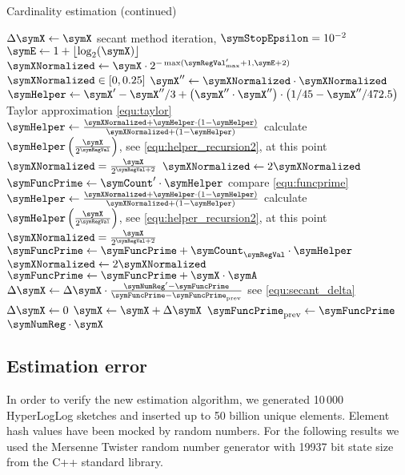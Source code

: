 \documentclass[a4paper]{scrartcl}
\begin{document}
\begin{algorithm}
\caption{Cardinality estimation (continued)}
\begin{algorithmic}
\State $\Delta\symX \gets \symX$
\While{$\Delta\symX > \symX\cdot\symError$} \Comment secant method iteration, $\symStopEpsilon = 10^{-2}$
\State $\symE \gets 1+\lfloor\log_2(\symX)\rfloor$
\State $\symXNormalized \gets
\symX \cdot 2^{-\max(\symRegVal'_\text{max}+1, \symE+2)}$
\Comment $\symXNormalized \in [0, 0.25]$
\State $\symX''\gets \symXNormalized\cdot\symXNormalized$
\State $\symHelper \gets
\symX' - \symX''/3 + \left(\symX''\cdot \symX''\right)\cdot\left(1/45-\symX''/472.5\right)$
\Comment Taylor approximation \eqref{equ:taylor}
\State $\symHelper \gets \frac{\symXNormalized+\symHelper\cdot(1-\symHelper)}{\symXNormalized+(1-\symHelper)}$
\Comment calculate $\symHelper\left(\frac{\symX}{2^{\symRegVal}}\right)$, see \eqref{equ:helper_recursion2}, at this point $\symXNormalized = \frac{\symX}{2^{\symRegVal+2}}$
\State $\symXNormalized \gets 2\symXNormalized$
\EndFor
\State $\symFuncPrime \gets \symCount'\cdot\symHelper$
\Comment compare \eqref{equ:funcprime}
\State $\symHelper \gets \frac{\symXNormalized+\symHelper\cdot(1-\symHelper)}{\symXNormalized+(1-\symHelper)}$
\Comment calculate $\symHelper\left(\frac{\symX}{2^{\symRegVal}}\right)$, see \eqref{equ:helper_recursion2}, at this point $\symXNormalized = \frac{\symX}{2^{\symRegVal+2}}$
\State $\symFuncPrime\gets \symFuncPrime + \symCount_\symRegVal\cdot\symHelper$
\State $\symXNormalized \gets 2\symXNormalized$
\EndFor
\State $\symFuncPrime\gets \symFuncPrime + \symX\cdot\symA$
\State $\Delta\symX \gets \Delta\symX \cdot \frac{\symNumReg' - \symFuncPrime}{\symFuncPrime - \symFuncPrime_\text{prev}}$
\Comment see \eqref{equ:secant_delta}
\Else
\State $\Delta\symX \gets 0$
\EndIf
\State $\symX \gets \symX + \Delta\symX$
\State $\symFuncPrime_\text{prev}\gets \symFuncPrime$
\EndWhile
\State \Return $\symNumReg\cdot\symX$
\EndFunction
\end{algorithmic}
\end{algorithm}

\subsection{Estimation error}
In order to verify the new estimation algorithm, we generated 10\,000 HyperLogLog sketches and inserted up to 50 billion unique elements. Element hash values have been mocked by random numbers. For the following results we used the Mersenne Twister random number generator with 19937 bit state size from the C++ standard library.
\end{document}

